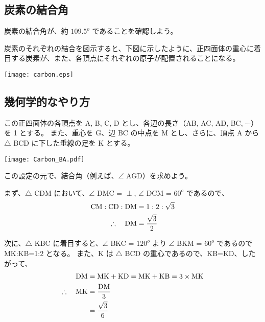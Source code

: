\documentclass[a4paper,11pt]{ltjsarticle}
\begin{document}
\begin{itemize}
%
%
%

\end{itemize}

\newpage

\begin{appendix}

\section{炭素の結合角}
\label{sec: carbon_BA}

炭素の結合角が、約 $109.5^o$ であることを確認しよう。

炭素のそれぞれの結合を図示すると、下図に示したように、正四面体の重心に着目する炭素が、また、各頂点にそれぞれの原子が配置されることになる。

\begin{center}
	\texttt{[image: carbon.eps]}
\end{center}

\subsection{幾何学的なやり方}

この正四面体の各頂点を A, B, C, D とし、各辺の長さ（AB, AC, AD, BC, $\cdots$）を 1 とする。
また、重心を G、辺 BC の中点を M とし、さらに、頂点 A から $\bigtriangleup$ BCD に下した垂線の足を K とする。


\begin{center}
	\texttt{[image: Carbon\_BA.pdf]}
\end{center}
この設定の元で、結合角（例えば、$\angle$ AGD）を求めよう。

まず、$\bigtriangleup$ CDM において、$\angle$ DMC = $\perp$, $\angle$ DCM = $60^o$ であるので、
\begin{align*}
{\rm CM} : {\rm CD} : {\rm DM} &= 1: 2 : \sqrt{3} \\
\therefore \quad {\rm DM} &= \dfrac{\sqrt{3}}{2}
\end{align*}

次に、$\bigtriangleup$ KBC に着目すると、$\angle$ BKC = $120^o$ より $\angle$ BKM = $60^o$ であるので MK:KB=1:2 となる。
また、K は $\bigtriangleup$ BCD の重心であるので、KB=KD、したがって、
\begin{align*}
{\rm DM} &= {\rm MK} + {\rm KD} = {\rm MK} + {\rm KB} = 3 \times {\rm MK} \\
\therefore \quad {\rm MK} 
	&=\dfrac{ {\rm DM} }{3} \\
	&=\dfrac{\sqrt{3}}{6}
\end{align*}


\end{appendix}
\end{document}
